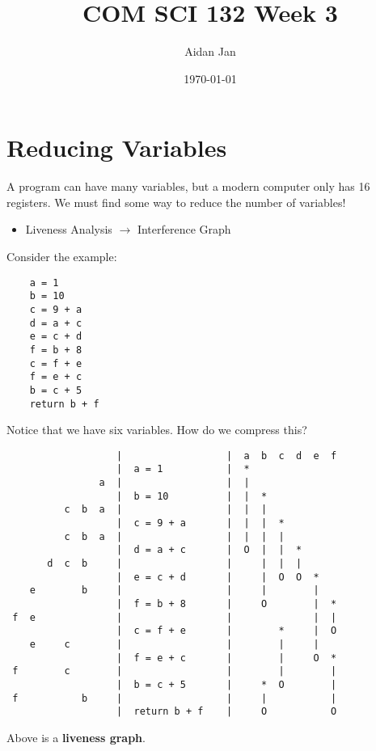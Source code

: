 \documentclass[10pt]{article}
\title{COM SCI 132 Week 3}
\author{Aidan Jan}
\date{\today}
\begin{document}
\maketitle
\section*{Reducing Variables}
A program can have many variables, but a modern computer only has 16 registers.  We must find some way to reduce the number of variables!\\
\begin{itemize}
    \item Liveness Analysis $\rightarrow$ Interference Graph
\end{itemize}
Consider the example:
\begin{verbatim}
    a = 1
    b = 10
    c = 9 + a
    d = a + c
    e = c + d
    f = b + 8
    c = f + e
    f = e + c
    b = c + 5
    return b + f
\end{verbatim}
Notice that we have six variables.  How do we compress this?
\begin{verbatim}
                   |                  |  a  b  c  d  e  f
                   |  a = 1           |  *
                a  |                  |  | 
                   |  b = 10          |  |  *
          c  b  a  |                  |  |  |
                   |  c = 9 + a       |  |  |  *
          c  b  a  |                  |  |  |  |
                   |  d = a + c       |  O  |  |  *
       d  c  b     |                  |     |  |  |
                   |  e = c + d       |     |  O  O  *
    e        b     |                  |     |        |
                   |  f = b + 8       |     O        |  *
 f  e              |                  |              |  |
                   |  c = f + e       |        *     |  O
    e     c        |                  |        |     |
                   |  f = e + c       |        |     O  *
 f        c        |                  |        |        |
                   |  b = c + 5       |     *  O        |
 f           b     |                  |     |           |
                   |  return b + f    |     O           O
\end{verbatim}
Above is a \textbf{liveness graph}.
\end{document}
